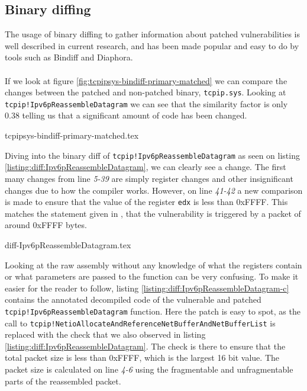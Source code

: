 \documentclass{report}
\begin{document}
\subsection{Binary diffing}
The usage of binary diffing to gather information about patched vulnerabilities is well described in current research\cite{url:binary-diffing:1}\cite{url:binary-diffing:2}, and has been made popular and easy to do by tools such as Bindiff\cite{url:bindiff:homepage} and Diaphora\cite{url:diaphora:homepage}.
\\
\\
If we look at figure \ref{fig:tcpipsys-bindiff-primary-matched} we can compare the changes between the patched and non-patched binary, \texttt{tcpip.sys}. Looking at \texttt{tcpip!Ipv6pReassembleDatagram} we can see that the similarity factor is only 0.38 telling us that a significant amount of code has been changed.

{tcpipsys-bindiff-primary-matched.tex}

Diving into the binary diff of \texttt{tcpip!Ipv6pReassembleDatagram} as seen on listing \ref{listing:diff:Ipv6pReassembleDatagram}, we can clearly see a change. The first many changes from line \emph{5-39} are simply register changes and other insignificant changes due to how the compiler works. However, on line \emph{41-42} a new comparison is made to ensure that the value of the register \texttt{edx} is less than 0xFFFF. This matches the statement given in , that the vulnerability is triggered by a packet of around 0xFFFF bytes.

{diff-Ipv6pReassembleDatagram.tex}

Looking at the raw assembly without any knowledge of what the registers contain or what parameters are passed to the function can be very confusing. To make it easier for the reader to follow, listing \ref{listing:diff:Ipv6pReassembleDatagram-c} contains the annotated decompiled code of the vulnerable and patched \texttt{tcpip!Ipv6pReassembleDatagram} function. Here the patch is easy to spot, as the call to \texttt{tcpip!NetioAllocateAndReferenceNetBufferAndNetBufferList} is replaced with the check that we also observed in listing \ref{listing:diff:Ipv6pReassembleDatagram}. The check is there to ensure that the total packet size is less than 0xFFFF, which is the largest 16 bit value. The packet size is calculated on line \emph{4-6} using the fragmentable and unfragmentable parts of the reassembled packet.
\end{document}
